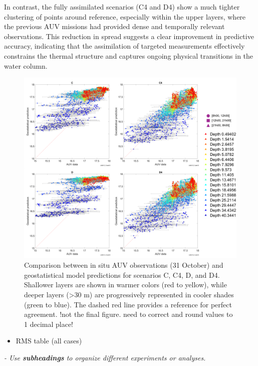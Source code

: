 In contrast, the fully assimilated scenarios (C4 and D4) show a much tighter clustering of points around reference, especially within the upper layers, where the previous AUV missions had provided dense and temporally relevant observations. This reduction in spread suggests a clear improvement in predictive accuracy, indicating that the assimilation of targeted measurements effectively constrains the thermal structure and captures ongoing physical transitions in the water column. 



\begin{figure}[!]
  \centering
  \includegraphics[scale=0.7]{fig/scatter.png}
  \caption{Comparison between in situ AUV observations (31 October) and geostatistical model predictions for scenarios C, C4, D, and D4. Shallower layers are shown in warmer colors (red to yellow), while deeper layers (>30 m) are progressively represented in cooler shades (green to blue). The dashed red line provides a reference for perfect agreement.  !not the final figure. need to correct and round values to 1 decimal place!}
  \label{fig:scatter}
\end{figure}



\begin{itemize}
    
    \item RMS table (all cases)
\end{itemize}

 
\textit{- Use \textbf{subheadings} to organize different experiments or analyses.}
